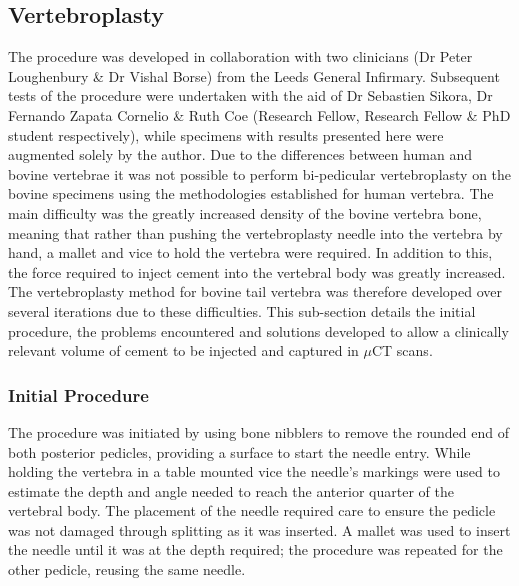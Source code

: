 \subsection{Vertebroplasty }\label{vertebroplasty-bov}
The procedure was developed in collaboration with two clinicians (Dr Peter Loughenbury \& Dr Vishal Borse) from the Leeds General Infirmary. Subsequent tests of the procedure were undertaken with the aid of Dr Sebastien Sikora, Dr Fernando Zapata Cornelio \& Ruth Coe (Research Fellow, Research Fellow \& PhD student respectively), while specimens with results presented here were augmented solely by the author.
Due to the differences between human and bovine vertebrae it was not possible to perform bi-pedicular vertebroplasty on the bovine specimens using the methodologies established for human vertebra.
The main difficulty was the greatly increased density of the bovine vertebra bone, meaning that rather than pushing the vertebroplasty needle into the vertebra by hand, a mallet and vice to hold the vertebra were required. In addition to this, the force required to inject cement into the vertebral body was greatly increased.
The vertebroplasty method for bovine tail vertebra was therefore developed over several iterations due to these difficulties. This sub-section details the initial procedure, the problems encountered and solutions developed to allow a clinically relevant volume of cement to be injected and captured in $\mu$CT scans.

\subsubsection{Initial Procedure}

The procedure was initiated by using bone nibblers to remove the rounded end of both posterior pedicles, providing a surface to start the needle entry. While holding the vertebra in a table mounted vice the needle's markings were used to estimate the depth and angle needed to reach the anterior quarter of the vertebral body. The placement of the needle required care to ensure the pedicle was not damaged through splitting as it was inserted. A mallet was used to insert the needle until it was at the depth
required; the procedure was repeated for the other pedicle, reusing the same needle.



